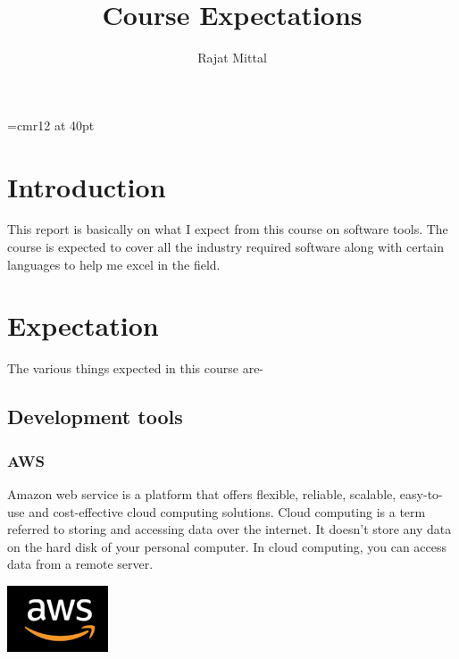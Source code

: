 \documentclass[11pt]{article}
\begin{document}
\begin{titlepage}
\font\myfont=cmr12 at 40pt
\author{\normalsize {Rajat Mittal}}


\title{\myfont Course Expectations}

\maketitle
\end{titlepage}

\pagebreak
\addtocounter{page}{1}
\section{Introduction}

\hspace{1in}This report is basically on what I expect from this course on software tools. The course is expected to cover all the industry required software along with certain languages to help me excel in the field.


\section{Expectation}
The various things expected in this course are-
\hspace{1in}\subsection{Development tools}
\subsubsection{AWS}
\hspace{1in}Amazon web service is a platform that offers flexible, reliable, scalable, easy-to-use and cost-effective cloud computing solutions. Cloud computing is a term referred to storing and accessing data over the internet. It doesn't store any data on the hard disk of your personal computer. In cloud computing, you can access data from a remote server.


\vspace{2cm}

\includegraphics[width=30mm,scale=0.5]{aws}
\end{document}
